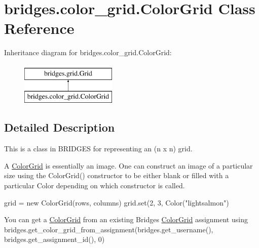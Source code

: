 \hypertarget{classbridges_1_1color__grid_1_1_color_grid}{}\section{bridges.\+color\+\_\+grid.\+Color\+Grid Class Reference}
\label{classbridges_1_1color__grid_1_1_color_grid}
Inheritance diagram for bridges.\+color\+\_\+grid.\+Color\+Grid\+:\begin{figure}[H]
\begin{center}
\leavevmode
\includegraphics[height=2.000000cm]{classbridges_1_1color__grid_1_1_color_grid}
\end{center}
\end{figure}


\subsection{Detailed Description}
This is a class in B\+R\+I\+D\+G\+ES for representing an (n x n) grid. 

A \mbox{\hyperlink{classbridges_1_1color__grid_1_1_color_grid}{Color\+Grid}} is essentially an image. One can construct an image of a particular size using the Color\+Grid() constructor to be either blank or filled with a particular Color depending on which constructor is called.


\begin{DoxyCode}
grid = new ColorGrid(rows, columns)
grid.set(2, 3, Color(\textcolor{stringliteral}{"lightsalmon"})
\end{DoxyCode}


You can get a \mbox{\hyperlink{classbridges_1_1color__grid_1_1_color_grid}{Color\+Grid}} from an existing Bridges \mbox{\hyperlink{classbridges_1_1color__grid_1_1_color_grid}{Color\+Grid}} assignment using bridges.\+get\+\_\+color\+\_\+grid\+\_\+from\+\_\+assignment(bridges.\+get\+\_\+username(), bridges.\+get\+\_\+assignment\+\_\+id(), 0)

